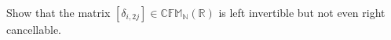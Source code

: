 Show that the matrix $[\delta_{i,2j}] \in \mathbb{CFM}_{\mathbb{N}}(\mathbb{R})$ is left invertible but not even right cancellable.
